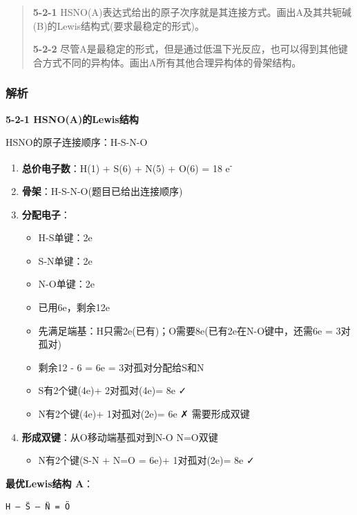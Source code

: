 \begin{quote}
\textbf{5-2-1} HSNO(A)表达式给出的原子次序就是其连接方式。画出A及其共轭碱(B)的Lewis结构式(要求最稳定的形式)。

\textbf{5-2-2} 尽管A是最稳定的形式，但是通过低温下光反应，也可以得到其他键合方式不同的异构体。画出A所有其他合理异构体的骨架结构。
\end{quote}

\subsubsection{解析}\label{ux89e3ux6790-2}

\textbf{5-2-1 HSNO(A)的Lewis结构}

HSNO的原子连接顺序：H-S-N-O

\begin{enumerate}
\def\labelenumi{\arabic{enumi}.}
\tightlist
\item
  \textbf{总价电子数}：H(1) + S(6) + N(5) + O(6) = 18 e\textsuperscript{-}
\item
  \textbf{骨架}：H-S-N-O(题目已给出连接顺序)
\item
  \textbf{分配电子}：

  \begin{itemize}
  \tightlist
  \item
    H-S单键：2e
  \item
    S-N单键：2e
  \item
    N-O单键：2e
  \item
    已用6e，剩余12e
  \item
    先满足端基：H只需2e(已有)；O需要8e(已有2e在N-O键中，还需6e = 3对孤对)
  \item
    剩余12 - 6 = 6e = 3对孤对分配给S和N
  \item
    S有2个键(4e)+ 2对孤对(4e)= 8e ✓
  \item
    N有2个键(4e)+ 1对孤对(2e)= 6e ✗ \箭 需要形成双键
  \end{itemize}
\item
  \textbf{形成双键}：从O移动端基孤对到N-O \箭 N=O双键

  \begin{itemize}
  \tightlist
  \item
    N有2个键(S-N + N=O = 6e)+ 1对孤对(2e)= 8e ✓
  \end{itemize}
\end{enumerate}

\textbf{最优Lewis结构 A}：

\begin{verbatim}
H — S̈ — N̈ = Ö
\end{verbatim}

